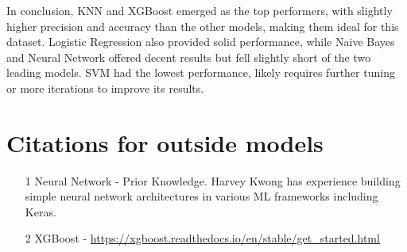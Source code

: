 \documentclass[manuscript,screen,review, nonacm]{acmart}
\begin{document}
In conclusion, KNN and XGBoost emerged as the top performers, with slightly higher precision 
and accuracy than the other models, making them ideal for this dataset. Logistic Regression 
also provided solid performance, while Naive Bayes and Neural Network offered decent results 
but fell slightly short of the two leading models. SVM had the lowest performance, likely 
requires further tuning or more iterations to improve its results.


\section{Citations for outside models}

\begin{itemize}

  \item[1] Neural Network - 
  Prior Knowledge. Harvey Kwong has experience building simple neural network architectures in various ML frameworks including Keras.
  
  \item[2] XGBoost - 
  \url{https://xgboost.readthedocs.io/en/stable/get_started.html}
  
\end{itemize}
\end{document}
